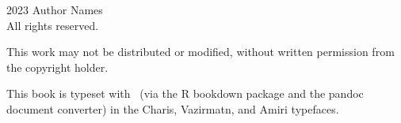 \thispagestyle{empty}
\begingroup
\footnotesize
\parindent 0pt
\parskip \baselineskip
\textcopyright{} 2023 Author Names \\
All rights reserved.

    This work may not be distributed or modified, without written permission from the copyright holder.

\texttt{\gitTag}

This book is typeset with \XeLaTeX\ (via the R bookdown package and the pandoc document converter)
in the Charis, Vazirmatn, and Amiri typefaces.


\vfill




%

